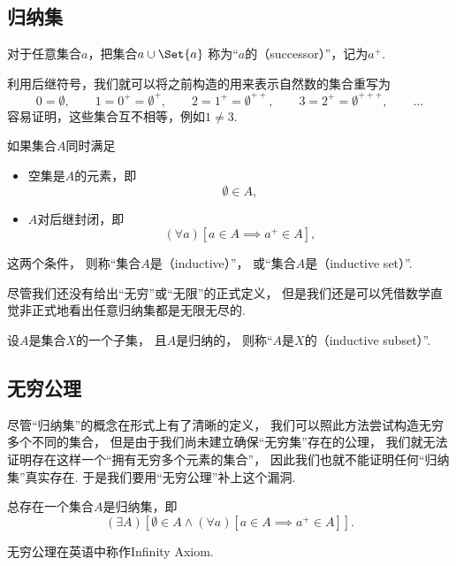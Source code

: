\subsection{归纳集}
\begin{definition}[后继]\label{definition:集合论.后继的定义}
对于任意集合\(a\)，把集合\(a \cup \Set{a}\)%
称为“\(a\)的（successor）”，记为\(a^+\).
\end{definition}

利用后继符号，我们就可以将之前构造的用来表示自然数的集合重写为\begin{equation*}
	0=\emptyset, \qquad
	1=0^+=\emptyset^+, \qquad
	2=1^+=\emptyset^{++}, \qquad
	3=2^+=\emptyset^{+++}, \qquad
	\dotsc
\end{equation*}
容易证明，这些集合互不相等，例如\(1\neq3\).

\begin{definition}[归纳集]\label{definition:集合论.归纳集的定义}
如果集合\(A\)同时满足
\begin{itemize}
	\item 空集是\(A\)的元素，即\begin{equation*}
		\emptyset \in A,
	\end{equation*}
	\item \(A\)对后继封闭，即\begin{equation*}
		(\forall a)[a \in A \implies a^+ \in A],
	\end{equation*}
\end{itemize}
这两个条件，
则称“集合\(A\)是（inductive）”，
或“集合\(A\)是（inductive set）”.
\end{definition}
尽管我们还没有给出“无穷”或“无限”的正式定义，
但是我们还是可以凭借数学直觉非正式地看出任意归纳集都是无限无尽的.

\begin{definition}
设\(A\)是集合\(X\)的一个子集，
且\(A\)是归纳的，
则称“\(A\)是\(X\)的（inductive subset）”.
\end{definition}

\subsection{无穷公理}
尽管“归纳集”的概念在形式上有了清晰的定义，
我们可以照此方法尝试构造无穷多个不同的集合，
但是由于我们尚未建立确保“无穷集”存在的公理，
我们就无法证明存在这样一个“拥有无穷多个元素的集合”，
因此我们也就不能证明任何“归纳集”真实存在.
于是我们要用“无穷公理”补上这个漏洞.
\begin{axiom}[无穷公理]
总存在一个集合\(A\)是归纳集，即\begin{equation*}
	(\exists A)[
		\emptyset \in A
		\land
		(\forall a)[a \in A \implies a^+ \in A]
	].
\end{equation*}
\end{axiom}
无穷公理在英语中称作Infinity Axiom.

